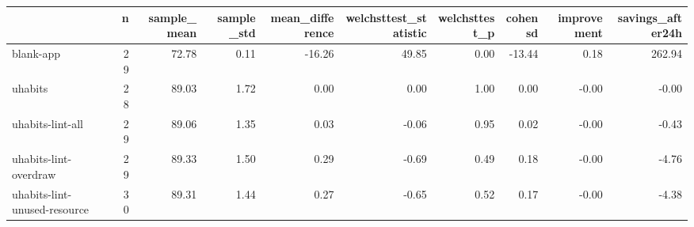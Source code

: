 \begin{tabular}{lrrrrrrrrr}
\toprule
{} &   n &  sample\_mean &  sample\_std &  mean\_difference &  welchsttest\_statistic &  welchsttest\_p &  cohensd &  improvement &  savings\_after24h \\
\midrule
blank-app                    &  29 &        72.78 &        0.11 &           -16.26 &                  49.85 &           0.00 &   -13.44 &         0.18 &            262.94 \\
uhabits                      &  28 &        89.03 &        1.72 &             0.00 &                   0.00 &           1.00 &     0.00 &        -0.00 &             -0.00 \\
uhabits-lint-all             &  29 &        89.06 &        1.35 &             0.03 &                  -0.06 &           0.95 &     0.02 &        -0.00 &             -0.43 \\
uhabits-lint-overdraw        &  29 &        89.33 &        1.50 &             0.29 &                  -0.69 &           0.49 &     0.18 &        -0.00 &             -4.76 \\
uhabits-lint-unused-resource &  30 &        89.31 &        1.44 &             0.27 &                  -0.65 &           0.52 &     0.17 &        -0.00 &             -4.38 \\
\bottomrule
\end{tabular}
